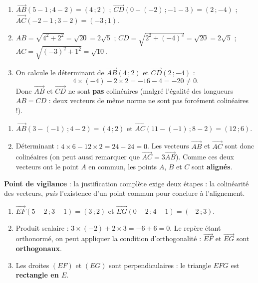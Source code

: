 \documentclass[11pt]{article}
\begin{document}
\begin{corrige}
\begin{enumerate}
\item $\overrightarrow{AB}(5-1\,;4-2) = (4\,;2)$ ; $\overrightarrow{CD}(0-(-2)\,;-1-3) = (2\,;-4)$ ; $\overrightarrow{AC}(-2-1\,;3-2) = (-3\,;1)$.
\item $AB = \sqrt{4^2+2^2} = \sqrt{20} = 2\sqrt{5}$ ; $CD = \sqrt{2^2+(-4)^2} = \sqrt{20} = 2\sqrt{5}$ ; $AC = \sqrt{(-3)^2+1^2} = \sqrt{10}$.
\item On calcule le déterminant de $\overrightarrow{AB}(4\,;2)$ et $\overrightarrow{CD}(2\,;-4)$ :
\[ 4\times(-4) - 2\times 2 = -16-4 = -20 \neq 0. \]
Donc $\overrightarrow{AB}$ et $\overrightarrow{CD}$ ne sont \textbf{pas} colinéaires (malgré l'égalité des longueurs $AB = CD$ : deux vecteurs de même norme ne sont pas forcément colinéaires !).
\end{enumerate}
\end{corrige}

\begin{corrige}
\begin{enumerate}
\item $\overrightarrow{AB}(3-(-1)\,;4-2) = (4\,;2)$ et $\overrightarrow{AC}(11-(-1)\,;8-2) = (12\,;6)$.
\item Déterminant : $4\times 6 - 12\times 2 = 24-24 = 0$. Les vecteurs $\overrightarrow{AB}$ et $\overrightarrow{AC}$ sont donc colinéaires (on peut aussi remarquer que $\overrightarrow{AC} = 3\overrightarrow{AB}$). Comme ces deux vecteurs ont le point $A$ en commun, les points $A$, $B$ et $C$ sont \textbf{alignés}.
\end{enumerate}
\textbf{Point de vigilance} : la justification complète exige deux étapes : la colinéarité des vecteurs, \emph{puis} l'existence d'un point commun pour conclure à l'alignement.
\end{corrige}

\begin{corrige}
\begin{enumerate}
\item $\overrightarrow{EF}(5-2\,;3-1) = (3\,;2)$ et $\overrightarrow{EG}(0-2\,;4-1) = (-2\,;3)$.
\item Produit scalaire : $3\times(-2) + 2\times 3 = -6+6 = 0$. Le repère étant orthonormé, on peut appliquer la condition d'orthogonalité : $\overrightarrow{EF}$ et $\overrightarrow{EG}$ sont \textbf{orthogonaux}.
\item Les droites $(EF)$ et $(EG)$ sont perpendiculaires : le triangle $EFG$ est \textbf{rectangle en $E$}.
\end{enumerate}
\end{corrige}
\end{document}
